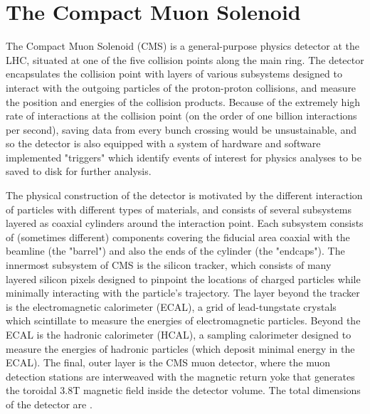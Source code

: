 \section{The Compact Muon Solenoid}
\label{sec:cms}
The Compact Muon Solenoid (CMS) is a general-purpose physics detector at the LHC, situated at one of the five collision points along the main ring. The detector encapsulates the collision point with layers of various subsystems designed to interact with the outgoing particles of the proton-proton collisions, and measure the position and energies of the collision products. Because of the extremely high rate of interactions at the collision point (on the order of one billion interactions per second), saving data from every bunch crossing would be unsustainable, and so the detector is also equipped with a system of hardware and software implemented "triggers" which identify events of interest for physics analyses to be saved to disk for further analysis.

The physical construction of the detector is motivated by the different interaction of particles with different types of materials, and consists of several subsystems layered as coaxial cylinders around the interaction point. Each subsystem consists of (sometimes different) components covering the fiducial area coaxial with the beamline (the "barrel") and also the ends of the cylinder (the "endcaps"). The innermost subsystem of CMS is the silicon tracker, which consists of many layered silicon pixels designed to pinpoint the locations of charged particles while minimally interacting with the particle's trajectory. The layer beyond the tracker is the electromagnetic calorimeter (ECAL), a grid of lead-tungstate crystals which scintillate to measure the energies of electromagnetic particles. Beyond the ECAL is the hadronic calorimeter (HCAL), a sampling calorimeter designed to measure the energies of hadronic particles (which deposit minimal energy in the ECAL). The final, outer layer is the CMS muon detector, where the muon detection stations are interweaved with the magnetic return yoke that generates the toroidal 3.8T magnetic field inside the detector volume. The total dimensions of the detector are .

